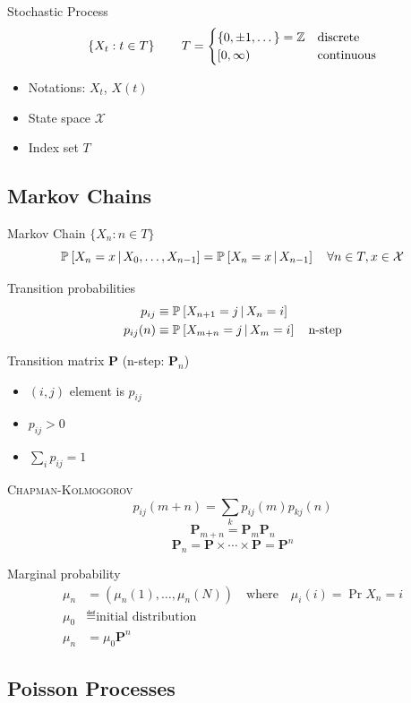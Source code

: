 \documentclass[landscape]{article}
\begin{document}
\begin{multicols*}{2}
Stochastic Process
$$\left\{ X_t : t \in T\right\} \qquad T=\begin{cases}\{0,\pm1,\dots\}=\mathbb{Z} &
  \text{discrete} \\ [0,\infty) & \text{continuous}\end{cases}$$

\begin{itemize}
  \item Notations: $X_t$, $X(t)$
  \item State space $\mathcal{X}$
  \item Index set $T$
\end{itemize}

\subsection{Markov Chains}

Markov Chain $\{X_n: n \in T\}$
$$\mathbb{P}_{}\left[X_n = x \,|\, X_0,\dots,X_{n-1}\right] = \mathbb{P}_{}\left[X_n = x \,|\, X_{n-1}\right]
\quad \forall n\in T, x \in \mathcal{X}$$

Transition probabilities
\begin{align*}
p_{ij} &\equiv \mathbb{P}_{}\left[X_{n+1} = j \,|\, X_n = i\right] \\
p_{ij}(n) &\equiv \mathbb{P}_{}\left[X_{m+n} = j \,|\, X_m = i\right] \quad\text{n-step}
\end{align*}

Transition matrix $\mathbf{P}$ (n-step: $\mathbf{P}_n$)
\begin{itemize}
  \item $(i,j)$ element is $p_{ij}$
  \item $p_{ij} > 0$
  \item $\sum_i p_{ij} = 1$
\end{itemize}

\textsc{Chapman-Kolmogorov}
$$p_{ij}(m+n) = \sum_k p_{ij}(m) p_{kj}(n)$$
$$\mathbf{P}_{m+n} = \mathbf{P}_m\mathbf{P}_n$$
$$\mathbf{P}_n = \mathbf{P} \times \cdots \times \mathbf{P} = \mathbf{P}^n$$

Marginal probability
\begin{align*}
\mu_n &= (\mu_n(1),\dots,\mu_n(N)) \quad\text{where}\quad \mu_i(i)=\Pr{X_n=i} \\
\mu_0 &\eqdef \text{initial distribution} \\
\mu_n &= \mu_0\mathbf{P}^n
\end{align*}

\subsection{Poisson Processes}


\end{multicols*}
\end{document}
